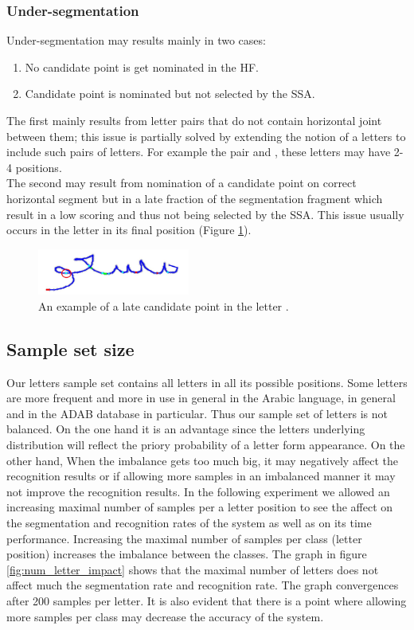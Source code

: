 \documentclass[journal,compsoc]{IEEEtran}
\begin{document}
\subsubsection{Under-segmentation}
Under-segmentation may results mainly in two cases:
\begin{enumerate}
\item No candidate point is get nominated in the HF.
\item Candidate point is nominated but not selected by the SSA.
\end{enumerate}

The first mainly results from letter pairs that do not contain horizontal joint between them; this issue is partially solved by extending the notion of a letters to include such pairs of letters. For example the pair  and , these letters may have 2-4 positions. \\

The second may result from nomination of a candidate point on correct horizontal segment but in a late fraction of the segmentation fragment which result in a low scoring and thus not being selected by the SSA. This issue usually occurs in the letter  in its final position (Figure \ref{fig:undersegmentation_w}).

\begin{figure}[h]
\centering
\includegraphics[width=5cm]{./figures/undersegmentation_w}
\caption{An example of a late candidate point in the letter .}
\label{fig:undersegmentation_w}
\end{figure}


\subsection{Sample set size}
Our letters sample set contains all letters in all its possible positions. Some letters are more frequent and more in use in general in the Arabic language, in general and in the ADAB database in particular. Thus our sample set of letters is not balanced.
On the one hand it is an advantage since the letters underlying distribution will reflect the priory probability of a letter form appearance.
On the other hand, When the imbalance gets too much big, it may negatively affect the recognition results or if allowing more samples in an imbalanced manner it may not improve the recognition results.
In the following experiment we allowed an increasing maximal number of samples per a letter position to see the affect on the segmentation and recognition rates of the system as well as on its time performance. Increasing the maximal number of samples per class (letter position) increases the imbalance between the classes. The graph in figure \ref{fig:num_letter_impact} shows that the maximal number of letters does not affect much the segmentation rate and recognition rate. The graph convergences after 200 samples per letter.  It is also evident that there is a point where allowing more samples per class may decrease the accuracy of the system.
\end{document}
